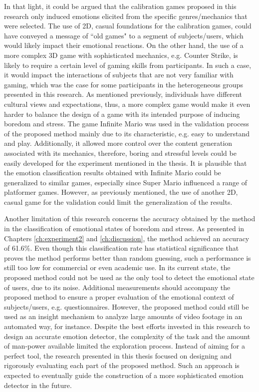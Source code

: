 In that light, it could be argued that the calibration games proposed in this research only induced emotions elicited from the specific genres/mechanics that were selected. The use of 2D, casual foundations for the calibration games, could have conveyed a message of ``old games" to a segment of subjects/users, which would likely impact their emotional reactions. On the other hand, the use of a more complex 3D game with sophisticated mechanics, e.g. Counter Strike, is likely to require a certain level of gaming skills from participants. In such a case, it would impact the interactions of subjects that are not very familiar with gaming, which was the case for some participants in the heterogeneous groups presented in this research. As mentioned previously, individuals have different cultural views and expectations, thus, a more complex game would make it even harder to balance the design of a game with its intended purpose of inducing boredom and stress. The game Infinite Mario was used in the validation process of the proposed method mainly due to its characteristic, e.g. easy to understand and play. Additionally, it allowed more control over the content generation associated with its mechanics, therefore, boring and stressful levels could be easily developed for the experiment mentioned in the thesis. It is plausible that the emotion classification results obtained with Infinite Mario could be generalized to similar games, especially since Super Mario influenced a range of platformer games. However, as previously mentioned, the use of another 2D, casual game for the validation could limit the generalization of the results.

Another limitation of this research concerns the accuracy obtained by the method in the classification of emotional states of boredom and stress. As presented in Chapters \ref{ch:experiment2} and \ref{ch:discussion}, the method achieved an accuracy of 61.6\%. Even though this classification rate has statistical significance that proves the method performs better than random guessing, such a performance is still too low for commercial or even academic use. In its current state, the proposed method could not be used as the only tool to detect the emotional state of users, due to its noise. Additional measurements should accompany the proposed method to ensure a proper evaluation of the emotional context of subjects/users, e.g. questionnaires. However, the proposed method could still be used as an insight mechanism to analyze large amounts of video footage in an automated way, for instance. Despite the best efforts invested in this research to design an accurate emotion detector, the complexity of the task and the amount of man-power available limited the exploration process. Instead of aiming for a perfect tool, the research presented in this thesis focused on designing and rigorously evaluating each part of the proposed method. Such an approach is expected to eventually guide the construction of a more sophisticated emotion detector in the future.

